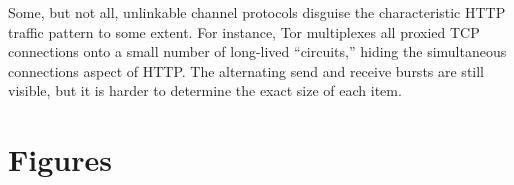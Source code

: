\documentclass{zarticle}
\begin{document}
Some, but not all, unlinkable channel protocols disguise the
characteristic HTTP traffic pattern to some extent.  For instance, Tor
multiplexes all proxied TCP connections onto a small number of
long-lived “circuits,” hiding the simultaneous connections aspect of
HTTP.  The alternating send and receive bursts are still visible, but
it is harder to determine the exact size of each item.


\printbibliography
\clearpage
\appendix
\section{Figures}


\end{document}
